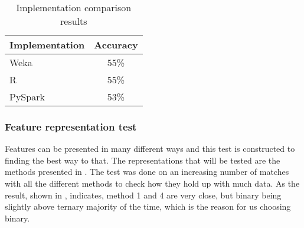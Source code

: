 \begin{table}[!htb]
  \centering
  \begin{tabular}{|l|c|}
    \hline
    Implementation  & Accuracy  \\
    \hline
    Weka & 55\%  \\
    R & 55\%\\
    PySpark & 53\%\\ 
    \hline
  \end{tabular}
  \caption{Implementation comparison results}
  \label{tab:impl_results}
\end{table}

\subsubsection{Feature representation test}
Features can be presented in many different ways and this test is constructed to finding the best way to that. The representations that will be tested are the methods presented in . The test was done on an increasing number of matches with all the different methods to check how they hold up with much data. As the result, shown in , indicates, method 1 and 4 are very close, but binary being slightly above ternary majority of the time, which is the reason for us choosing binary.

